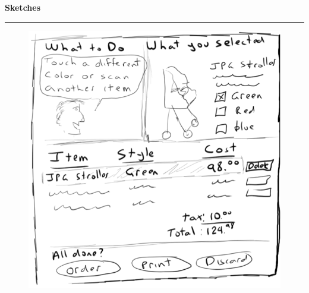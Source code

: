 \documentclass[pdf]{beamer}
\begin{document}



\begin{frame}
\vspace{8mm}
\textcolor{myBlue}{\textbf{\Large{Sketches}}}

\textcolor{red}{\rule{10cm}{1mm}}

    \begin{figure}[b]
    	\includegraphics[scale = 0.4]{slide16pic.png}
    \end{figure}
\end{frame}
\end{document}
